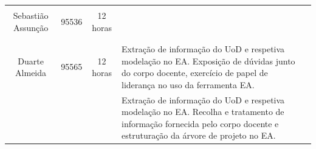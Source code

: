 \documentclass{article}
\begin{document}
\begin{table}[H]
\begin{tabular}{|l|l|l|l|l}
        \multicolumn{1}{|l|}{}                   & \multicolumn{1}{l|}{}       & \multicolumn{1}{l|}{}                             & \multicolumn{1}{l|}{}                   &  \\
        \multicolumn{1}{|c|}{Sebastião Assunção} & \multicolumn{1}{c|}{95536}  & \multicolumn{1}{c|}{12 horas}                     & \multicolumn{1}{l|}{}                   &  \\
        \multicolumn{1}{|l|}{}                   & \multicolumn{1}{l|}{}       & \multicolumn{1}{l|}{}                             & \multicolumn{1}{l|}{}                   &  \\
        \multicolumn{1}{|l|}{}                   & \multicolumn{1}{l|}{}       & \multicolumn{1}{l|}{}                             & \multicolumn{1}{l|}{}                   &  \\ \cline{1-4}
        \multicolumn{1}{|l|}{}                   & \multicolumn{1}{l|}{}       & \multicolumn{1}{l|}{}                             & \multirow{5}{7cm}{Extração de informação do UoD e respetiva modelação no EA. Exposição de dúvidas junto do corpo docente, exercício de papel de liderança no uso da ferramenta EA.}                   &  \\
        \multicolumn{1}{|l|}{}                   & \multicolumn{1}{l|}{}       & \multicolumn{1}{l|}{}                             & \multicolumn{1}{l|}{}                   &  \\
        \multicolumn{1}{|c|}{Duarte Almeida}     & \multicolumn{1}{c|}{95565}  & \multicolumn{1}{c|}{12 horas}                     & \multicolumn{1}{l|}{}                   &  \\
        \multicolumn{1}{|l|}{}                   & \multicolumn{1}{l|}{}       & \multicolumn{1}{l|}{}                             & \multicolumn{1}{l|}{}                   &  \\
        \multicolumn{1}{|l|}{}                   & \multicolumn{1}{l|}{}       & \multicolumn{1}{l|}{}                             & \multicolumn{1}{l|}{}                   &  \\ \cline{1-4}
        \multicolumn{1}{|l|}{}                   & \multicolumn{1}{l|}{}       & \multicolumn{1}{l|}{}                             & \multirow{5}{7cm}{Extração de informação do UoD e respetiva modelação no EA. Recolha e tratamento de informação fornecida pelo corpo docente e estruturação da árvore de projeto no EA.}                   &  \\
        \multicolumn{1}{|l|}{}                   & \multicolumn{1}{l|}{}       & \multicolumn{1}{l|}{}                             & \multicolumn{1}{l|}{}                   &  \\

\end{tabular}
\end{table}
\end{document}
